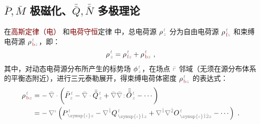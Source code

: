 \vspace*{-5.5em}

\subsection{$\bar{P},\bar{M}$ 极磁化、$\bar{\bar{Q}},\bar{\bar{N}}$ 多极理论}\label{ssec:PMQN}

在\textcolor{Maroon}{高斯定律（电）}  和\textcolor{Maroon}{电荷守恒}定律  中，总电荷源 ${\rho}^{\;\!\mathcolor{gray}{t}}_{\;\!\mathcolor{gray}{z}}$ 分为自由电荷源 ${\rho}^{\;\!\mathcolor{gray}{t}}_{\;\!\textcolor{Maroon}{\text{f}}\mathcolor{gray}{z}}$ 和束缚电荷源 ${\rho}^{\;\!\mathcolor{gray}{t}}_{\;\!\textcolor{Maroon}{\text{b}}\mathcolor{gray}{z}}$\cite{langeMultipoleTheoryHehl2015,raabMultipoleTheoryElectromagnetism2004}，即：
\abovedisplayskip=5pt
\belowdisplayskip=5pt
\begin{align} \label{eq:p=f+b}
	{\rho}^{\;\!\mathcolor{gray}{t}}_{\;\!\mathcolor{gray}{z}} = {\rho}^{\;\!\mathcolor{gray}{t}}_{\;\!\textcolor{Maroon}{\text{f}}\mathcolor{gray}{z}} + {\rho}^{\;\!\mathcolor{gray}{t}}_{\;\!\textcolor{Maroon}{\text{b}}\mathcolor{gray}{z}}~,
\end{align}
其中，对动态电荷源分布所产生的标势场 $\phi^{\;\!\mathcolor{gray}{t}}_{\;\!\mathcolor{gray}{z}}$，在场点 $\mathcolor{gray}{\bar{r}}$ 邻域（无须在源分布体系的平衡态附近），进行三元泰勒展开，得束缚电荷体密度 ${\rho}^{\;\!\mathcolor{gray}{t}}_{\;\!\textcolor{Maroon}{\text{b}}\mathcolor{gray}{z}}$ 的表达式\cite{raabMultipoleTheoryElectromagnetism2004,delangeTranslationalInvariancePost2012,chen-zhuChenZhuxieUndergraduate_courses2024}：
\begin{subequations}
	\abovedisplayskip=-10pt
\begin{align}
	{\rho}^{\;\!\mathcolor{gray}{t}}_{\;\!\textcolor{Maroon}{\text{b}}\mathcolor{gray}{z}} &= -\hspace{0.2em} \mathcolor{gray}{\bar{\nabla} \cdot} \left( \bar{P}^{\;\!\mathcolor{gray}{t}}_{\;\!\mathcolor{gray}{z}} - \mathcolor{gray}{\bar{\nabla} \cdot} \bar{\bar{Q}}^{\;\!\mathcolor{gray}{t}}_{\;\!\mathcolor{gray}{z}} + \mathcolor{gray}{\bar{\nabla}} \mathcolor{gray}{\bar{\nabla} \colon}\! \bar{\bar{\bar{O}}}^{\;\!\mathcolor{gray}{t}}_{\;\!\mathcolor{gray}{z}} - \cdots \right) \label{eq:P-b} \\
	&= -\hspace{0.2em} \mathcolor{gray}{\nabla^\iota} \left( P^{\;\!\mathcolor{gray}{t}}_{\;\! \mathcolor{gray}{\symup{\iota}} \mathcolor{gray}{z}} - \mathcolor{gray}{\nabla^{\hat{1}}} Q^{\;\!\mathcolor{gray}{t}}_{\;\! \mathcolor{gray}{\symup{\iota} \hat{1}} \mathcolor{gray}{z}} + \mathcolor{gray}{\nabla^{\hat{1}}} \mathcolor{gray}{\nabla^{\hat{2}}} O^{\;\!\mathcolor{gray}{t}}_{\;\! \mathcolor{gray}{\symup{\iota} \hat{1} \hat{2}} \mathcolor{gray}{z}} - \cdots \right)~. \label{eq:p-b}
\end{align}
\end{subequations}

